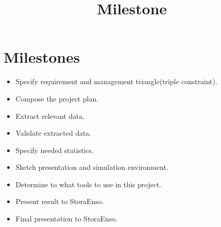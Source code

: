 \documentclass{report}
\begin{document}
\title{Milestone}
\maketitle 

\section{Milestones}
	\begin{itemize}
	\item
	Specify requirement and management triangle(triple constraint).
	\item
	Compose the project plan.
	\item
	Extract relevant data.
	\item
	Validate extracted data.
	\item
	Specify needed statistics.
	\item
	Sketch presentation and simulation environment.
	\item
	Determine to what tools to use in this project.
	\item
	Present result to StoraEnso.
	\item
	Final presentation to StoraEnso.
	\end{itemize}
\end{document}
